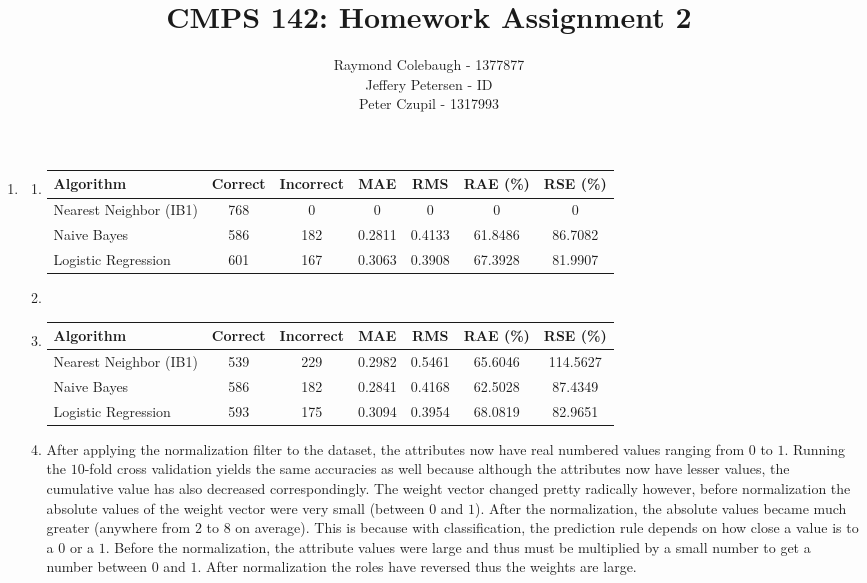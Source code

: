 \documentclass{article}
\title{CMPS 142: Homework Assignment 2}
\author{Raymond Colebaugh - 1377877\\Jeffery Petersen - ID\\Peter Czupil - 1317993}
\begin{document}
\maketitle
\begin{enumerate}
        \item 
            \begin{enumerate}
                \item
                    \begin{tabular}{l | c c c c c c}
                        Algorithm      & Correct & Incorrect & MAE & RMS & RAE (\%) & RSE (\%)\\
                        \hline
                        Nearest Neighbor (IB1) & 768 & 0   & 0      & 0      & 0 & 0 \\
                        Naive Bayes            & 586 & 182 & 0.2811 & 0.4133 & 61.8486 & 86.7082 \\
                        Logistic Regression    & 601 & 167 & 0.3063 & 0.3908 & 67.3928 & 81.9907
                    \end{tabular}
                \item 
                \item
                    \begin{tabular}{l | c c c c c c}
                        Algorithm      & Correct & Incorrect & MAE & RMS & RAE (\%) & RSE (\%)\\
                        \hline
                        Nearest Neighbor (IB1) & 539 & 229 & 0.2982 & 0.5461 & 65.6046 & 114.5627 \\
                        Naive Bayes            & 586 & 182 & 0.2841 & 0.4168 & 62.5028 & 87.4349 \\
                        Logistic Regression    & 593 & 175 & 0.3094 & 0.3954 & 68.0819 & 82.9651
                    \end{tabular}
                \item
                   After applying the normalization filter to the dataset, the attributes now have real                		numbered values ranging from $0$ to $1$.
		Running the $10$-fold cross validation yields the same accuracies as well because 					although the attributes now have lesser values, the cumulative value has also decreased 			correspondingly.
		The weight vector changed pretty radically however, before normalization the absolute 			values of the weight vector were very small (between $0$ and $1$). After the 					normalization, the absolute values became much greater (anywhere from $2$ to $8$ on 			average). This is because with classification, the prediction rule depends on how close a 			value is to a $0$ or a $1$. Before the normalization, the attribute values were large and 			thus must be multiplied by a small number to get a number between $0$ and $1$. After 			normalization the roles have reversed thus the weights are large.

\end{enumerate}
\end{enumerate}
\end{document}
